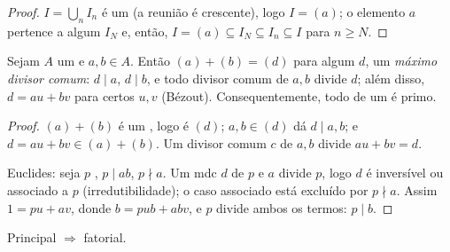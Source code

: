 \begin{proof}
$I = \bigcup_n I_n$ é um  (a reunião é crescente), logo $I =
(a)$; o elemento
$a$ pertence a algum $I_N$ e, então, $I = (a)
\subseteq I_N \subseteq I_n \subseteq I$ para $n \geq N$.
\end{proof}

\begin{lemma}\label{lem:b3:rings:bezout}
Sejam $A$ um  e $a, b \in A$. Então $(a) + (b) = (d)$ para algum $d$, um
\emph{máximo divisor comum}: $d \mid a$, $d \mid b$,
e todo divisor comum de $a,
b$ divide $d$; além disso, $d = au + bv$
para certos $u, v$ (Bézout). Consequentemente, todo  de um  é primo.
\end{lemma}

\begin{proof}
$(a) + (b)$ é um , logo é $(d)$; $a, b \in (d)$ dá $d \mid
a, b$; e $d = au + bv \in (a) + (b)$. Um divisor
comum $c$ de $a, b$ divide $au + bv = d$.

Euclides: seja $p$ , $p \mid ab$, $p \nmid a$. Um mdc $d$ de
$p$ e $a$ divide $p$, logo $d$ é inversível ou associado
a $p$ (irredutibilidade); o caso associado está excluído por $p \nmid a$.
Assim $1 = pu + av$, donde $b = pub + abv$, e $p$ divide ambos os termos: $p \mid b$.
\end{proof}

\begin{theorem}\label{thm:b3:rings:pidufd}
Principal $\Rightarrow$ fatorial.
\end{theorem}

